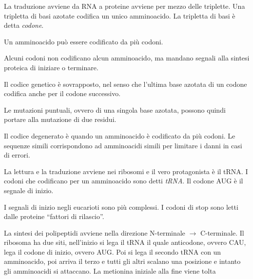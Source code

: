 La traduzione avviene da RNA a proteine avviene per mezzo delle triplette. Una tripletta di basi azotate codifica un unico amminoacido. La tripletta di basi è detta \emph{codone}.

Un amminoacido può essere codificato da più codoni.

Alcuni codoni non codificano alcun amminoacido, ma mandano segnali alla sintesi proteica di iniziare o terminare.

Il codice genetico è sovrapposto, nel senso che l'ultima base azotata di un codone codifica anche per il codone successivo.

Le mutazioni puntuali, ovvero di una singola base azotata, possono quindi portare alla mutazione di due residui.



Il codice degenerato è quando un amminoacido è codificato da più codoni. Le sequenze simili corrispondono ad amminoacidi simili per limitare i danni in casi di errori.

La lettura e la traduzione avviene nei ribosomi e il vero protagonista è il tRNA.{}
I codoni che codificano per un amminoacido sono detti \emph{tRNA}. Il codone AUG è il segnale di inizio.

I segnali di inizio negli eucarioti sono più complessi. I codoni di stop sono letti dalle proteine ``fattori di rilascio''.


La sintesi dei polipeptidi avviene nella direzione N-terminale $\to$ C-terminale. Il ribosoma ha due siti, nell'inizio si lega il tRNA il quale anticodone, ovvero CAU, lega il codone di inizio, ovvero AUG. Poi si lega il secondo tRNA con un amminoacido, poi arriva il terzo e tutti gli altri scalano una posizione e intanto gli amminoacidi si attaccano. La metionina iniziale alla fine viene tolta


